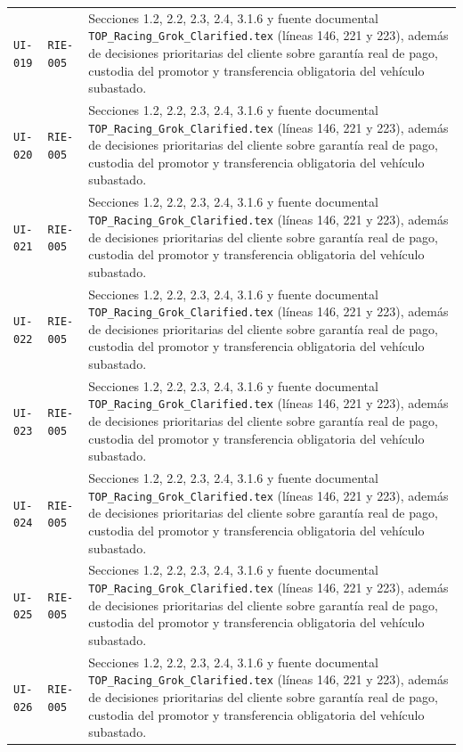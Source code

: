 \documentclass[10pt,letterpaper]{article}
\begin{document}
\begin{landscape}
\begin{longtable}{P{2.7cm}P{2.6cm}P{15.7cm}}
\texttt{UI-019} & \texttt{RIE-005} & Secciones 1.2, 2.2, 2.3, 2.4, 3.1.6 y fuente documental \texttt{TOP\_Racing\_Grok\_Clarified.tex} (líneas 146, 221 y 223), además de decisiones prioritarias del cliente sobre garantía real de pago, custodia del promotor y transferencia obligatoria del vehículo subastado.\\
\texttt{UI-020} & \texttt{RIE-005} & Secciones 1.2, 2.2, 2.3, 2.4, 3.1.6 y fuente documental \texttt{TOP\_Racing\_Grok\_Clarified.tex} (líneas 146, 221 y 223), además de decisiones prioritarias del cliente sobre garantía real de pago, custodia del promotor y transferencia obligatoria del vehículo subastado.\\
\texttt{UI-021} & \texttt{RIE-005} & Secciones 1.2, 2.2, 2.3, 2.4, 3.1.6 y fuente documental \texttt{TOP\_Racing\_Grok\_Clarified.tex} (líneas 146, 221 y 223), además de decisiones prioritarias del cliente sobre garantía real de pago, custodia del promotor y transferencia obligatoria del vehículo subastado.\\
\texttt{UI-022} & \texttt{RIE-005} & Secciones 1.2, 2.2, 2.3, 2.4, 3.1.6 y fuente documental \texttt{TOP\_Racing\_Grok\_Clarified.tex} (líneas 146, 221 y 223), además de decisiones prioritarias del cliente sobre garantía real de pago, custodia del promotor y transferencia obligatoria del vehículo subastado.\\
\texttt{UI-023} & \texttt{RIE-005} & Secciones 1.2, 2.2, 2.3, 2.4, 3.1.6 y fuente documental \texttt{TOP\_Racing\_Grok\_Clarified.tex} (líneas 146, 221 y 223), además de decisiones prioritarias del cliente sobre garantía real de pago, custodia del promotor y transferencia obligatoria del vehículo subastado.\\
\texttt{UI-024} & \texttt{RIE-005} & Secciones 1.2, 2.2, 2.3, 2.4, 3.1.6 y fuente documental \texttt{TOP\_Racing\_Grok\_Clarified.tex} (líneas 146, 221 y 223), además de decisiones prioritarias del cliente sobre garantía real de pago, custodia del promotor y transferencia obligatoria del vehículo subastado.\\
\texttt{UI-025} & \texttt{RIE-005} & Secciones 1.2, 2.2, 2.3, 2.4, 3.1.6 y fuente documental \texttt{TOP\_Racing\_Grok\_Clarified.tex} (líneas 146, 221 y 223), además de decisiones prioritarias del cliente sobre garantía real de pago, custodia del promotor y transferencia obligatoria del vehículo subastado.\\
\texttt{UI-026} & \texttt{RIE-005} & Secciones 1.2, 2.2, 2.3, 2.4, 3.1.6 y fuente documental \texttt{TOP\_Racing\_Grok\_Clarified.tex} (líneas 146, 221 y 223), además de decisiones prioritarias del cliente sobre garantía real de pago, custodia del promotor y transferencia obligatoria del vehículo subastado.\\

\end{longtable}
\end{landscape}
\end{document}
